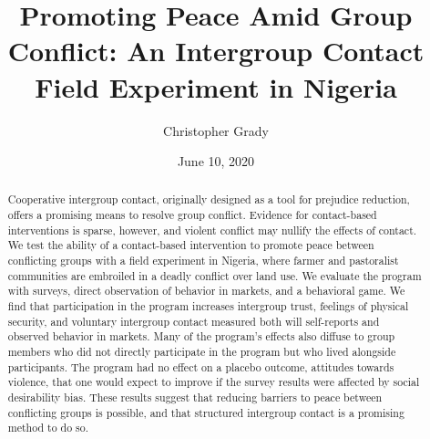 \documentclass[11pt]{article}
\title{Promoting Peace Amid Group Conflict: An Intergroup Contact Field
Experiment in Nigeria}
\author{
Christopher Grady
}
\date{June 10, 2020}
\begin{document}
\VerbatimFootnotes

%
%
%
%
%
%
%
%
%
%

\maketitle

\begin{abstract}

Cooperative intergroup contact, originally designed as a tool for prejudice reduction, offers a promising means to resolve group conflict.  Evidence for contact-based interventions is sparse, however, and violent conflict may nullify the effects of contact.  We test the ability of a contact-based intervention to promote peace between conflicting groups with a field experiment in Nigeria, where farmer and pastoralist communities are embroiled in a deadly conflict over land use.  We evaluate the program with surveys, direct observation of behavior in markets, and a behavioral game.  We find that participation in the program increases intergroup trust, feelings of physical security, and voluntary intergroup contact measured both will self-reports and observed behavior in markets.  Many of the program's effects also diffuse to group members who did not directly participate in the program but who lived alongside participants. The program had no effect on a placebo outcome, attitudes towards violence, that one would expect to improve if the survey results were affected by social desirability bias.  These results suggest that reducing barriers to peace between conflicting groups is possible, and that structured intergroup contact is a promising method to do so.

\end{abstract}
\end{document}
